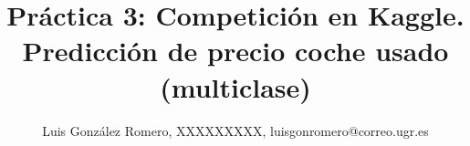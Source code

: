 \author{Luis González Romero, XXXXXXXXX, luisgonromero@correo.ugr.es}
\title{Práctica 3: Competición en Kaggle. Predicción de precio coche usado (multiclase)}
\newcommand{\grupopracticas}{Grupo 1: Miércoles 17:30-19:30}
\newcommand{\subtitulo}{Subtítulo}
\newcommand{\curso}{Inteligencia de Negocio}
\newcommand{\departamento}{Computación y Sistemas Inteligentes}